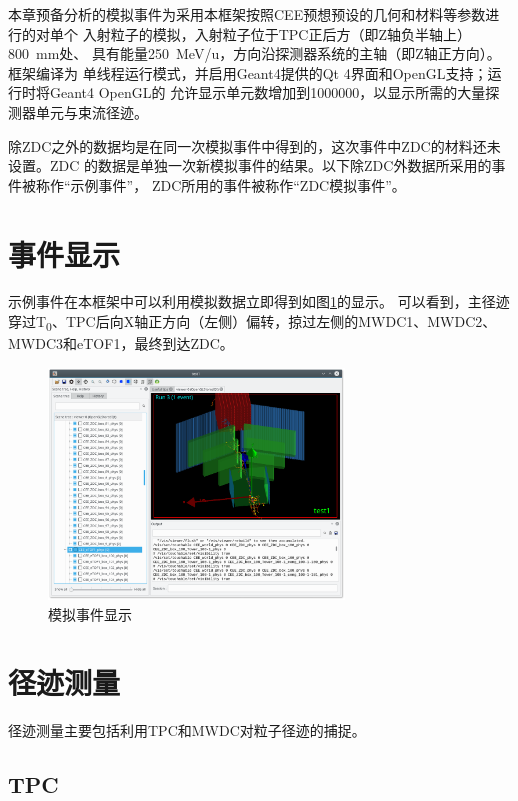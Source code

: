 \documentclass[bachelor,openany,oneside,color]{buaathesis}
\def\TZ{T\textsubscript{0}}
\begin{document}
本章预备分析的模拟事件为采用本框架按照CEE预想预设的几何和材料等参数进行的对单个
入射粒子的模拟，入射粒子位于TPC正后方（即Z轴负半轴上）\SI{800}{\milli\meter}处、
具有能量\SI{250}{\mega\eV/u}，方向沿探测器系统的主轴（即Z轴正方向）。框架编译为
单线程运行模式，并启用Geant4提供的Qt 4界面和OpenGL支持；运行时将Geant4 OpenGL的
允许显示单元数增加到1000000，以显示所需的大量探测器单元与束流径迹。

除ZDC之外的数据均是在同一次模拟事件中得到的，这次事件中ZDC的材料还未设置。ZDC
的数据是单独一次新模拟事件的结果。以下除ZDC外数据所采用的事件被称作“示例事件”，
ZDC所用的事件被称作“ZDC模拟事件”。

\section{事件显示}

示例事件在本框架中可以利用模拟数据立即得到如图\ref{fig:EventDisplay}的显示。
可以看到，主径迹穿过\TZ、TPC后向X轴正方向（左侧）偏转，掠过左侧的MWDC1、MWDC2、
MWDC3和eTOF1，最终到达ZDC。

\begin{figure}
	\centering
	\includegraphics[width=0.7\textwidth]{./resource/EventDisplay.png}
	\caption{模拟事件显示}\label{fig:EventDisplay}
\end{figure}

\section{径迹测量}

径迹测量主要包括利用TPC和MWDC对粒子径迹的捕捉。

\subsection{TPC}
\end{document}
